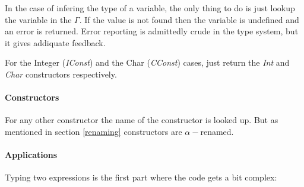 In the case of infering the type of a variable, the only thing to do is just lookup the variable in the $\Gamma$. If the value is not found then the variable is undefined and an error is returned. Error reporting is admittedly crude in the type system, but it gives addiquate feedback.

For the Integer (\emph{IConst}) and the Char (\emph{CConst}) cases, just return the \emph{Int} and \emph{Char} constructors respectively.

\paragraph{Constructors}
For any other constructor the name of the constructor is looked up. But as mentioned in section \ref{renaming} constructors are $\alpha-$renamed.


\paragraph{Applications}
Typing two expressions is the first part where the code gets a bit complex:

